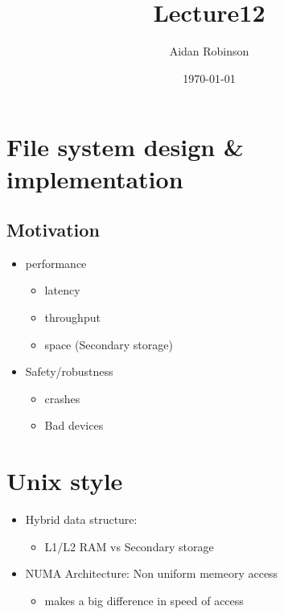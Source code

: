 \documentclass[11pt]{article}
\author{Aidan  Robinson}
\date{\today}
\title{Lecture12}
\begin{document}
\maketitle
\tableofcontents

\section{File system design \& implementation}
\label{sec:orgbfe35e5}
\subsection{Motivation}
\label{sec:org69fdc74}
\begin{itemize}
\item performance
\begin{itemize}
\item latency
\item throughput
\item space (Secondary storage)
\end{itemize}
\item Safety/robustness
\begin{itemize}
\item crashes
\item Bad devices
\end{itemize}
\end{itemize}
\section{Unix style}
\label{sec:orgf5abcc0}
\begin{itemize}
\item Hybrid data structure:
\begin{itemize}
\item L1/L2 RAM vs Secondary storage
\end{itemize}
\item NUMA Architecture: Non uniform memeory access
\begin{itemize}
\item makes a big difference in speed of access
\end{itemize}
\end{itemize}
\end{document}
